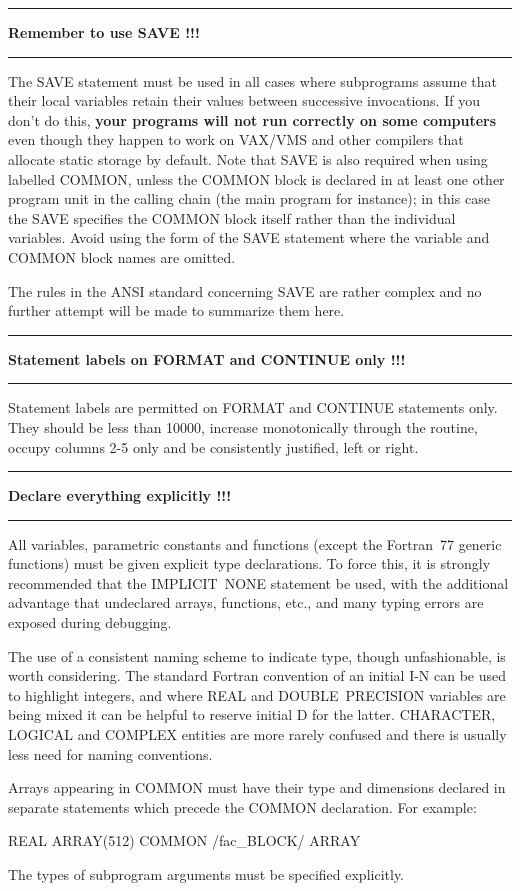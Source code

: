 \documentclass[twoside,11pt,nolof,noabs]{starlink}
\newcounter{sruleno}
\providecommand{\srule}[1]{
    \addtocounter{sruleno}{1}
    \goodbreak
    \rule{\textwidth}{0.3mm}
    \textbf{#1} \scpushright{ \textbf{\thesruleno}}
    \rule{\textwidth}{0.1mm}
}
\renewcommand{\_}{{\tt\char'137}}
\begin{document}
\srule{Remember to use SAVE !!!}
The SAVE statement must be used in all cases where
subprograms assume that their local variables retain
their values between successive invocations.  If you
don't do this, \textbf{your programs will not run
correctly on some computers} even though they happen to work on VAX/VMS
and other compilers that allocate static storage by default.
Note that SAVE is
also required when using labelled COMMON, unless the COMMON block is
declared in at least one other program unit in the calling chain
(the main program for instance); in this case the SAVE specifies the
COMMON block itself rather than the
individual variables.  Avoid using the form of the SAVE statement
where the variable and COMMON block names are omitted.

The rules in the ANSI standard concerning SAVE are rather complex and
no further attempt will be made to summarize them here.

\srule{Statement labels on FORMAT and CONTINUE only !!!}
Statement labels are permitted on FORMAT and CONTINUE statements only.
They should be less than 10000, increase monotonically through the routine,
occupy columns 2-5 only and be consistently justified, left or right.

\srule{Declare everything explicitly !!!}
All variables, parametric constants and functions (except the Fortran~77
generic functions) must be given explicit type declarations.
To force this, it is strongly recommended that the IMPLICIT~NONE statement be
used, with the additional advantage
that undeclared arrays, functions, etc., and
many typing errors are exposed during debugging.

The use of a consistent naming scheme to indicate type, though
unfashionable, is worth considering.
The standard Fortran convention of
an initial I-N can be used to highlight integers, and where REAL and
DOUBLE~PRECISION variables are being mixed it can be helpful to
reserve initial D for the latter.  CHARACTER, LOGICAL and
COMPLEX entities are more rarely confused and there is
usually less need for naming conventions.

Arrays appearing in COMMON must have their type and dimensions declared in
separate statements which precede the COMMON declaration.
For example:
\begin{terminalv}
    REAL ARRAY(512)
    COMMON /fac_BLOCK/ ARRAY
\end{terminalv}

The types of subprogram arguments must be specified explicitly.
\end{document}
